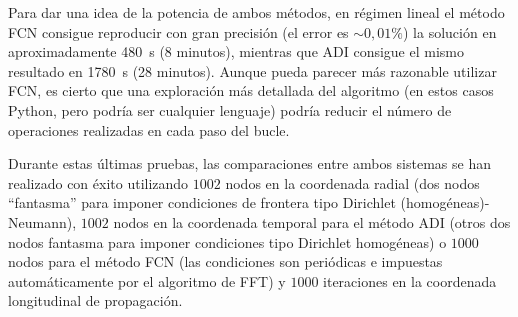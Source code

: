 \documentclass{scrartcl} %
\begin{document}
Para dar una idea de la potencia de ambos métodos, en régimen lineal el método FCN consigue reproducir con gran precisión (el error es $\sim 0,01\%$) la solución en aproximadamente \qty{480}{s} (8 minutos), mientras que ADI consigue el mismo resultado en \qty{1780}{s} (28 minutos). Aunque pueda parecer más razonable utilizar FCN, es cierto que una exploración más detallada del algoritmo (en estos casos Python, pero podría ser cualquier lenguaje) podría reducir el número de operaciones realizadas en cada paso del bucle. 

Durante estas últimas pruebas, las comparaciones entre ambos sistemas se han realizado con éxito utilizando $1002$ nodos en la coordenada radial (dos nodos \enquote{fantasma} para imponer condiciones de frontera tipo Dirichlet (homogéneas)-Neumann), $1002$ nodos en la coordenada temporal para el método ADI (otros dos nodos fantasma para imponer condiciones tipo Dirichlet homogéneas) o $1000$ nodos para el método FCN (las condiciones son periódicas e impuestas automáticamente por el algoritmo de FFT) y $1000$ iteraciones en la coordenada longitudinal de propagación.

\printbibliography
\end{document}
